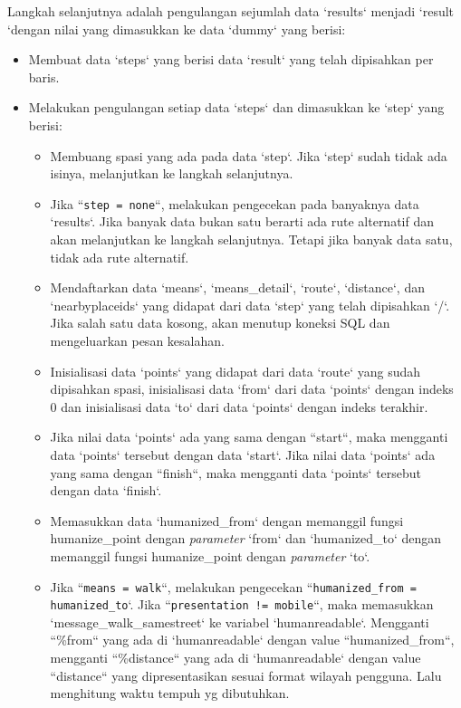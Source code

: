 Langkah selanjutnya adalah pengulangan sejumlah data `results` menjadi `result `dengan nilai yang dimasukkan ke data `dummy` yang berisi:
\begin{itemize}
	\item Membuat data `steps` yang berisi data `result` yang telah dipisahkan per baris.
	\item Melakukan pengulangan setiap data `steps` dan dimasukkan ke `step` yang berisi:
	\begin{itemize}
		\item Membuang spasi yang ada pada data `step`. Jika `step` sudah tidak ada isinya, melanjutkan ke langkah selanjutnya.
		\item Jika ``\texttt{step = none}``, melakukan pengecekan pada banyaknya data `results`. Jika banyak data bukan satu berarti ada rute alternatif dan akan melanjutkan ke langkah selanjutnya. Tetapi jika banyak data satu, tidak ada rute alternatif.
		\item Mendaftarkan data `means`, `means\_detail`, `route`, `distance`, dan `nearbyplaceids` yang didapat dari data `step` yang telah dipisahkan `/`. Jika salah satu data kosong, akan menutup koneksi SQL dan mengeluarkan pesan kesalahan.
		\item Inisialisasi data `points` yang didapat dari data `route` yang sudah dipisahkan spasi, inisialisasi data `from` dari data `points` dengan indeks 0 dan inisialisasi data `to` dari data `points` dengan indeks terakhir.
		\item Jika nilai data `points` ada yang sama dengan ``start``, maka mengganti data `points` tersebut dengan data `start`. Jika nilai data `points` ada yang sama dengan ``finish``, maka mengganti data `points` tersebut dengan data `finish`.
		 \item Memasukkan data `humanized\_from` dengan memanggil fungsi humanize\_point dengan \textit{parameter} `from` dan `humanized\_to` dengan memanggil fungsi humanize\_point dengan \textit{parameter} `to`.
		 \item Jika ``\texttt{means = walk}``, melakukan pengecekan ``\texttt{humanized\_from = humanized\_to}`. Jika ``\texttt{presentation != mobile}``, maka memasukkan `message\_walk\_samestreet` ke variabel `humanreadable`. Mengganti ``\%from`` yang ada di `humanreadable` dengan value ``humanized\_from``, mengganti ``\%distance`` yang ada di `humanreadable` dengan value ``distance`` yang dipresentasikan sesuai format wilayah pengguna. Lalu menghitung waktu tempuh yg dibutuhkan.

\end{itemize}
\end{itemize}
